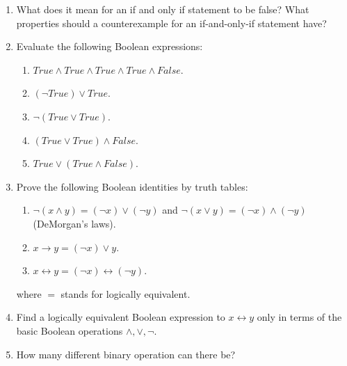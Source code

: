 \documentclass[11pt]{preprint}
\begin{document}
\begin{enumerate}
\item What does it mean for an if and only if statement to be false? What properties should a counterexample for an if-and-only-if statement have?
\item Evaluate the following Boolean expressions:
\begin{enumerate}
\item $True\wedge True\wedge True\wedge True\wedge False$.
\item $(\neg True)\vee True$. 
\item $\neg(True\vee True)$. 
\item $(True\vee True)\wedge False$.
\item $True\vee(True\wedge False)$. 
\end{enumerate}
\item Prove the following Boolean identities by truth tables:
\begin{enumerate}
\item $\neg(x\wedge y)=(\neg x)\vee (\neg y)$ and $\neg(x\vee y)=(\neg x)\wedge(\neg y)$ (DeMorgan's laws).
\item $x\rightarrow y= (\neg x)\vee y$.
\item $x\leftrightarrow y = (\neg x)\leftrightarrow (\neg y)$.
\end{enumerate}
where $=$ stands for logically equivalent.
\item Find a logically equivalent Boolean expression to $x\leftrightarrow y$ only in terms of the basic Boolean operations $\wedge,\vee,\neg$.
\item How many different binary operation can there be? 


\end{enumerate}
\end{document}
